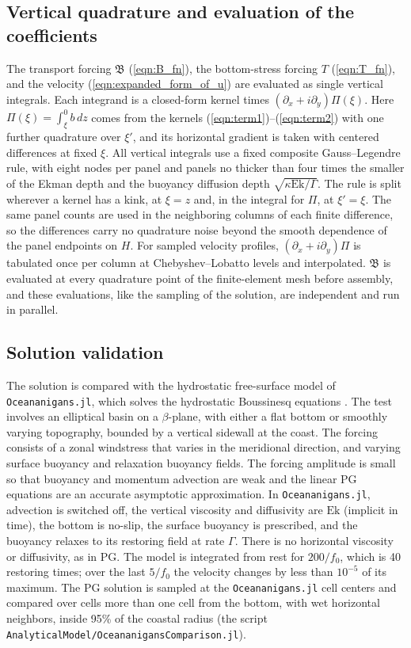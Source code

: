 \documentclass{ametsocV6.2}
\begin{document}
\subsection{Vertical quadrature and evaluation of the coefficients}
The transport forcing $\mathfrak{B}$ (\ref{eqn:B_fn}), the bottom-stress forcing $T$ (\ref{eqn:T_fn}), and the velocity (\ref{eqn:expanded_form_of_u}) are evaluated as single vertical integrals.
Each integrand is a closed-form kernel times $(\partial_x + i \partial_y) \Pi(\xi)$.
Here $\Pi(\xi) = \int_\xi^0 b \, dz$ comes from the kernels (\ref{eqn:term1})--(\ref{eqn:term2}) with one further quadrature over $\xi'$, and its horizontal gradient is taken with centered differences at fixed $\xi$.
All vertical integrals use a fixed composite Gauss--Legendre rule, with eight nodes per panel and panels no thicker than four times the smaller of the Ekman depth and the buoyancy diffusion depth $\sqrt{\kappa \mathrm{Ek}/\Gamma}$.
The rule is split wherever a kernel has a kink, at $\xi = z$ and, in the integral for $\Pi$, at $\xi' = \xi$.
The same panel counts are used in the neighboring columns of each finite difference, so the differences carry no quadrature noise beyond the smooth dependence of the panel endpoints on $H$.
For sampled velocity profiles, $(\partial_x + i \partial_y) \Pi$ is tabulated once per column at Chebyshev--Lobatto levels and interpolated.
$\mathfrak{B}$ is evaluated at every quadrature point of the finite-element mesh before assembly, and these evaluations, like the sampling of the solution, are independent and run in parallel.

\subsection{Solution validation}

The solution is compared with the hydrostatic free-surface model of \texttt{Oceananigans.jl}, which solves the hydrostatic Boussinesq equations \citep{wagner_etal25}.
The test involves an elliptical basin on a $\beta$-plane, with either a flat bottom or smoothly varying topography, bounded by a vertical sidewall at the coast. 
The forcing consists of a zonal windstress that varies in the meridional direction, and varying surface buoyancy and relaxation buoyancy fields.
The forcing amplitude is small so that buoyancy and momentum advection are weak and the linear PG equations are an accurate asymptotic approximation.
In \texttt{Oceananigans.jl}, advection is switched off, the vertical viscosity and diffusivity are $\mathrm{Ek}$ (implicit in time), the bottom is no-slip, the surface buoyancy is prescribed, and the buoyancy relaxes to its restoring field at rate $\Gamma$.
There is no horizontal viscosity or diffusivity, as in PG.
The model is integrated from rest for $200/f_0$, which is 40 restoring times; over the last $5/f_0$ the velocity changes by less than $10^{-5}$ of its maximum.
The PG solution is sampled at the \texttt{Oceananigans.jl} cell centers and compared over cells more than one cell from the bottom, with wet horizontal neighbors, inside 95\% of the coastal radius (the script \texttt{AnalyticalModel/OceananigansComparison.jl}).
\end{document}
